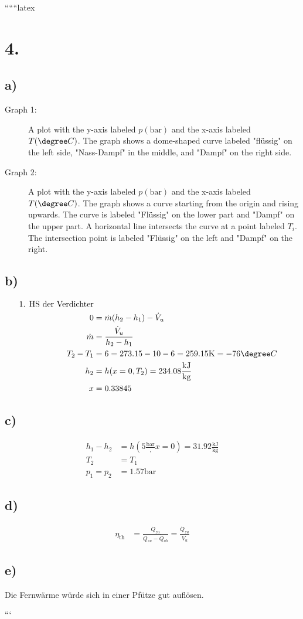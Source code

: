 
``````latex


\section*{4.}

\subsection*{a)}

\begin{description}
    \item[Graph 1:] A plot with the y-axis labeled \( p(\text{bar}) \) and the x-axis labeled \( T(\degree C) \). The graph shows a dome-shaped curve labeled "flüssig" on the left side, "Nass-Dampf" in the middle, and "Dampf" on the right side.
    \item[Graph 2:] A plot with the y-axis labeled \( p(\text{bar}) \) and the x-axis labeled \( T(\degree C) \). The graph shows a curve starting from the origin and rising upwards. The curve is labeled "Flüssig" on the lower part and "Dampf" on the upper part. A horizontal line intersects the curve at a point labeled \( T_i \). The intersection point is labeled "Flüssig" on the left and "Dampf" on the right.
\end{description}

\subsection*{b)}

\begin{align*}
    \text{1. HS der Verdichter} \\
    0 &= \dot{m} (h_2 - h_1) - \dot{V}_u \\
    \dot{m} &= \frac{\dot{V}_u}{h_2 - h_1} \\
    T_2 - T_1 &= 6 = 273.15 - 10 - 6 = 259.15 \text{K} = -76 \degree C \\
    h_2 &= h(x=0, T_2) = 234.08 \frac{\text{kJ}}{\text{kg}} \\
    x &= 0.33845
\end{align*}

\subsection*{c)}

\begin{align*}
    h_1 - h_2 &= h \left( 5 \frac{\text{bar}}, x=0 \right) = 31.92 \frac{\text{kJ}}{\text{kg}} \\
    T_2 &= T_1 \\
    p_1 = p_2 &= 1.57 \text{bar}
\end{align*}

\subsection*{d)}

\begin{align*}
    \eta_{\text{th}} &= \frac{\dot{Q}_{zu}}{\dot{Q}_{zu} - \dot{Q}_{ab}} = \frac{\dot{Q}_{zu}}{\dot{V}_u}
\end{align*}

\subsection*{e)}

Die Fernwärme würde sich in einer Pfütze gut auflösen.

```
